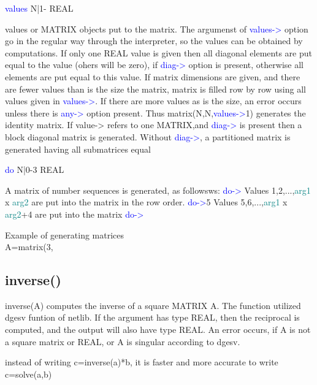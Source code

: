 \vspace{0.3cm}
\hline
\vspace{0.3cm}
\noindent \textcolor{blue}{values} \tabto{3cm} N|1- \tabto{5cm}   REAL  \tabto{7cm}
\begin{changemargin}{3cm}{0cm}
\noindent values or MATRIX objects put to the matrix. The argumenst of
\textcolor{blue}{values->} option go in the regular way
through the interpreter, so the values can be obtained by computations. If only one REAL value is
given then all diagonal elements are put equal to the value (ohers will be zero),
if \textcolor{blue}{diag->} option is present, otherwise all elements are put equal to this value. If matrix dimensions
are given, and there are fewer values than is the size the matrix, matrix is
filled row by row using all values given in
\textcolor{blue}{values->}. If there are more values as is the size, an error occurs unless there is
\textcolor{blue}{any->} option present.
Thus \textcolor{VioletRed}{matrix}(N,N,\textcolor{blue}{values->}1) generates the identity matrix.
If value-> refers to one MATRIX,and \textcolor{blue}{diag->} is present then a block diagonal
matrix is generated. Without \textcolor{blue}{diag->}, a partitioned matrix is generated having all
submatrices equal
\end{changemargin}
\vspace{0.3cm}
\hline
\vspace{0.3cm}
\noindent \textcolor{blue}{do}  \tabto{3cm} N|0-3 \tabto{5cm}  REAL   \tabto{7cm}
\begin{changemargin}{3cm}{0cm}
\noindent  A matrix of number sequences is generated, as followsws: \newline
\textcolor{blue}{do->} Values 1,2,...,\textcolor{teal}{arg1} x \textcolor{teal}{arg2} are put into the matrix in the row order. \newline
\textcolor{blue}{do->}5 Values 5,6,...,\textcolor{teal}{arg1} x \textcolor{teal}{arg2}+4 are put into the matrix \newline
\textcolor{blue}{do->}
\end {changemargin}
\hline
\vspace{0.2cm}
\begin{example}[matrixex]Example of generating matrices\\
\label{matrixex}
A=\textcolor{VioletRed}{matrix}(3,
\end{example}
\subsection{\textcolor{VioletRed}{inverse}()}
\label{inverse}
\textcolor{VioletRed}{inverse}(A) computes the inverse of a square MATRIX A. The function utilized dgesv funtion
of netlib. If the argument has type REAL, then the reciprocal is computed,
and the output will also have type REAL. An error occurs, if A is not
a square matrix or REAL, or A is singular according to dgesv.
\begin{note}
instead of writing c=\textcolor{VioletRed}{inverse}(a)*b, it is faster and more accurate to
write c=\textcolor{VioletRed}{solve}(a,b)
\end{note}
